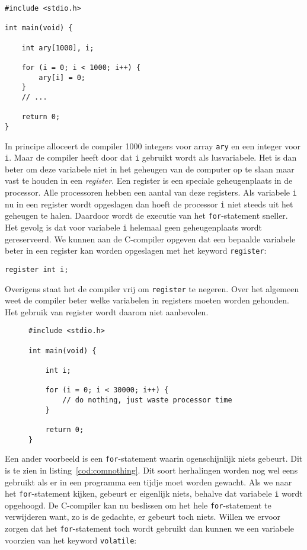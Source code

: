 \begin{lstlisting}[caption=Een C-programma.,label=cod:comclearary]
#include <stdio.h>

int main(void) {

    int ary[1000], i;
    
    for (i = 0; i < 1000; i++) {
        ary[i] = 0;
    }
    // ...
    
    return 0;
}
\end{lstlisting}

In principe alloceert de compiler 1000 integers voor array \texttt{ary} en een integer voor \texttt{i}. Maar de compiler heeft door dat \texttt{i} gebruikt wordt als lusvariabele. Het is dan beter om deze variabele niet in het geheugen van de computer op te slaan maar vast te houden in een \textsl{register}. Een register is een speciale geheugenplaats in de processor. Alle processoren hebben een aantal van deze registers. Als variabele \texttt{i} nu in een register wordt opgeslagen dan hoeft de processor \texttt{i} niet steeds uit het geheugen te halen. Daardoor wordt de executie van het \texttt{for}-statement sneller. Het gevolg is dat voor variabele \texttt{i} helemaal geen geheugenplaats wordt gereserveerd. We kunnen aan de C-compiler opgeven dat een bepaalde variabele beter in een register kan worden opgeslagen met het keyword \texttt{register}:

\hspace*{1em}\texttt{register int i;}

Overigens staat het de compiler vrij om \texttt{register} te negeren. Over het algemeen weet de compiler beter welke variabelen in registers moeten worden gehouden. Het gebruik van register wordt daarom niet aanbevolen.

\begin{figure}[!ht]
\begin{lstlisting}[caption=Een C-programma.,label=cod:comnothing]
#include <stdio.h>

int main(void) {

    int i;
    
    for (i = 0; i < 30000; i++) {
        // do nothing, just waste processor time
    }
    
    return 0;
}
\end{lstlisting}
\end{figure}

Een ander voorbeeld is een \texttt{for}-statement waarin ogenschijnlijk niets gebeurt. Dit is te zien in listing~\ref{cod:comnothing}.
Dit soort herhalingen worden nog wel eens gebruikt als er in een programma een tijdje moet worden gewacht. Als we naar het \texttt{for}-statement kijken, gebeurt er eigenlijk niets, behalve dat variabele \texttt{i} wordt opgehoogd. De C-compiler kan nu beslissen om het hele \texttt{for}-statement te verwijderen want, zo is de gedachte, er gebeurt toch niets. Willen we ervoor zorgen dat het \texttt{for}-statement toch wordt gebruikt dan kunnen we een variabele voorzien van het keyword \texttt{volatile}:

